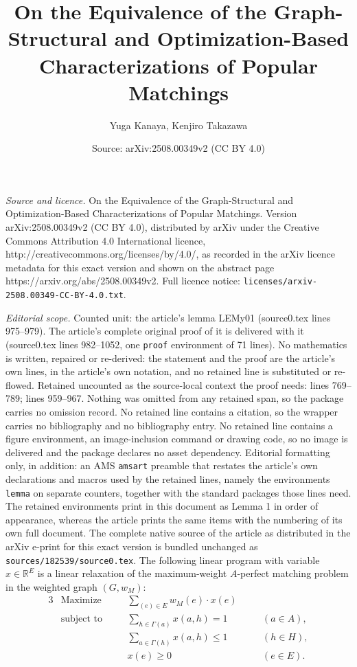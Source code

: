 \documentclass[10pt,a4paper]{amsart}
\title{On the Equivalence of the Graph-Structural and Optimization-Based Characterizations of Popular Matchings}
\author{Yuga Kanaya, Kenjiro Takazawa}
\date{Source: arXiv:2508.00349v2 (CC BY 4.0)}
\newcommand{\RR}{{\mathbb{R}}}
\begin{document}
\maketitle

\noindent\emph{Source and licence.} On the Equivalence of the Graph-Structural and Optimization-Based Characterizations of Popular Matchings. Version arXiv:2508.00349v2 (CC BY 4.0), distributed by arXiv under the Creative Commons Attribution 4.0 International licence, http://creativecommons.org/licenses/by/4.0/, as recorded in the arXiv licence metadata for this exact version and shown on the abstract page https://arxiv.org/abs/2508.00349v2. Full licence notice: \texttt{licenses/arxiv-2508.00349-CC-BY-4.0.txt}.\par\smallskip

\noindent\textit{Editorial scope.} Counted unit: the article's lemma LEMy01 (source0.tex lines 975--979). The article's complete original proof of it is delivered with it (source0.tex lines 982--1052, one \texttt{proof} environment of 71 lines). No mathematics is written, repaired or re-derived: the statement and the proof are the article's own lines, in the article's own notation, and no retained line is substituted or re-flowed.  Retained uncounted as the source-local context the proof needs: lines 769--789; lines 959--967.  Nothing was omitted from any retained span, so the package carries no omission record.  No retained line contains a citation, so the wrapper carries no bibliography and no bibliography entry.  No retained line contains a figure environment, an image-inclusion command or drawing code, so no image is delivered and the package declares no asset dependency.  Editorial formatting only, in addition: an AMS \texttt{amsart} preamble that restates the article's own declarations and macros used by the retained lines, namely the environments \texttt{lemma} on separate counters, together with the standard packages those lines need.  The retained environments print in this document as Lemma 1 in order of appearance, whereas the article prints the same items with the numbering of its own full document.  The complete native source of the article as distributed in the arXiv e-print for this exact version is bundled unchanged as \texttt{sources/182539/source0.tex}.
The following linear program with variable $x\in \RR^E$ is a linear relaxation of the 
maximum-weight $A$-perfect matching problem in the weighted graph $(G,w_M)$: 
\begin{alignat}{3}
\label{EQLPobj}
&\mbox{Maximize}    &\quad& \sum_{(e)\in E} w_M(e)\cdot x(e)     && \\
&\mbox{subject to}  &\quad& \sum_{h\in \Gamma(a)}x(a,h)=1                &\quad& (a\in A),
\label{EQLPconst1} \\
&                   &\quad& \sum_{a\in \Gamma(h)}x(a,h)\le 1             &\quad& (h\in H),
\label{EQLPconst2}\\
&                   &\quad&x(e)\ge 0                                        &\quad& (e\in E).
\label{EQLPconst3}
\end{alignat}
\end{document}
